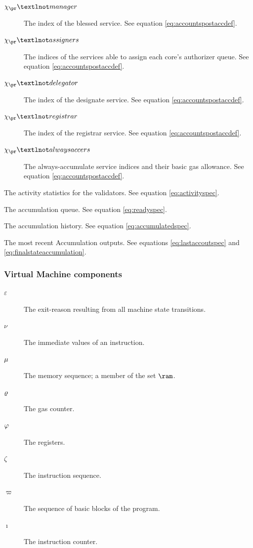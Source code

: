 \begin{description}
  \begin{description}
    \item[$\manager$] The index of the blessed service. See equation \ref{eq:accountspostaccdef}.
    \item[$\assigners$] The indices of the services able to assign each core's authorizer queue. See equation \ref{eq:accountspostaccdef}.
    \item[$\delegator$] The index of the designate service. See equation \ref{eq:accountspostaccdef}.
    \item[$\registrar$] The index of the registrar service. See equation \ref{eq:accountspostaccdef}.
    \item[$\alwaysaccers$] The always-accumulate service indices and their basic gas allowance. See equation \ref{eq:accountspostaccdef}.
  \end{description}
  \item[$\activity$] The activity statistics for the validators. See equation \ref{eq:activityspec}.
  \item[$\ready$] The accumulation queue. See equation \ref{eq:readyspec}.
  \item[$\accumulated$] The accumulation history. See equation \ref{eq:accumulatedspec}.
  \item[$\lastaccout$] The most recent Accumulation outputs. See equations \ref{eq:lastaccoutspec} and \ref{eq:finalstateaccumulation}.
\end{description}

\subsubsection{Virtual Machine components}

\begin{description}
  \item[$\varepsilon$] The exit-reason resulting from all machine state transitions.
  \item[$\nu$] The immediate values of an instruction.
  \item[$\mu$] The memory sequence; a member of the set $\ram$.
  \item[$\varrho$] The gas counter.
  \item[$\varphi$] The registers.
  \item[$\zeta$] The instruction sequence.
  \item[$\varpi$] The sequence of basic blocks of the program.
  \item[$\imath$] The instruction counter.
\end{description}

